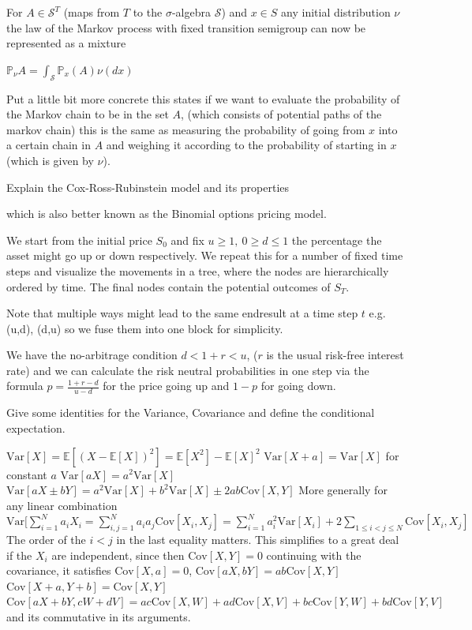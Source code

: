 For \( A \in \mathcal{S}^{T} \) (maps from \( T \) to the \( \sigma \)-algebra \( \mathcal{S} \)) and \( x \in S \)
any initial distribution \( \nu \) the law of the Markov process with fixed transition semigroup
can now be represented as a mixture

\( \mathbb{P}_{\nu}A = \int_{\mathcal{S}}\mathbb{P}_{x}(A)\nu(dx) \)

Put a little bit more concrete this states if we want to evaluate the probability
of the Markov chain to be in the set \( A \), (which consists of potential paths of the markov chain) 
this is the same as measuring the probability of going from \( x \) into a certain chain in \( A \)
and weighing it according to the probability of starting in \( x \) (which is given by \( \nu \)).


Explain the Cox-Ross-Rubinstein model and its properties

which is also better known as the Binomial options pricing model.

We start from the initial price \( S_0 \) and fix \( u \geq 1,\ 0 \geq d \leq 1 \) the percentage 
the asset might go up or down respectively. We repeat this for a number of fixed time steps
and visualize the movements in a tree, where the nodes are hierarchically ordered by time.
The final nodes contain the potential outcomes of \( S_T \).

Note that multiple ways might lead to the same endresult at a time step \( t \)
e.g. (u,d), (d,u) so we fuse them into one block for simplicity.

We have the no-arbitrage condition \( d < 1 + r < u \), (\( r \) is the usual risk-free interest rate)
and we can calculate the risk neutral probabilities in one step via the formula \( p = \frac{1+r - d}{u-d} \)
for the price going up and \( 1 - p \) for going down.


Give some identities for the Variance, Covariance and 
define the conditional expectation.

\( \text{Var}[X] = \mathbb{E}[(X - \mathbb{E}[X])^2] = \mathbb{E}[X^2] - \mathbb{E}[X]^2 \)
\( \text{Var}[X + a] =  \text{Var}[X]\) for constant \( a \)
\( \text{Var}[aX] =  a^2\text{Var}[X]\)
\( \text{Var}[aX \pm bY] =  a^2\text{Var}[X] + b^2\text{Var}[X] \pm 2ab\text{Cov}[X, Y]\)
More generally for any linear combination
\( \text{Var}[\sum_{i=1}^N a_iX_i = \sum_{i,j=1}^N a_ia_j\text{Cov}[X_i, X_j] = \sum_{i=1}^{N} a_i^2\text{Var}[X_i] + 2\sum_{1 \leq i < j \leq N} \text{Cov}[X_i, X_j] \)
The order of the \( i < j \) in the last equality matters.
This simplifies to a great deal if the \( X_i \) are independent, since then
\( \text{Cov}[X, Y] = 0 \)
continuing with the covariance, it satisfies
\( \text{Cov}[X, a] = 0 \), 
\( \text{Cov}[aX, bY] = ab\text{Cov}[X,Y] \)
\( \text{Cov}[X + a, Y + b] = \text{Cov}[X,Y] \)
\( \text{Cov}[aX + bY, cW + dV] = ac\text{Cov}[X,W] + ad\text{Cov}[X,V] + bc\text{Cov}[Y,W] + bd\text{Cov}[Y,V] \)
and its commutative in its arguments.

